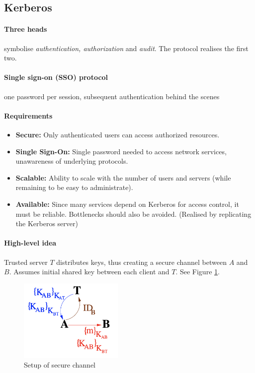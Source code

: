 \subsection{Kerberos}

\paragraph{Three heads} symbolise \emph{authentication, authorization} and \emph{audit}. The protocol realises the first two.

\paragraph{Single sign-on (SSO) protocol} one password per session, subsequent authentication behind the scenes

\paragraph{Requirements}
\begin{itemize}
    \item \textbf{Secure:} Only authenticated users can access authorized resources.
    \item \textbf{Single Sign-On:} Single password needed to access network services, unawareness of underlying protocols.
    \item \textbf{Scalable:} Ability to scale with the number of users and servers (while remaining to be easy to administrate).
    \item \textbf{Available:} Since many services depend on Kerberos for access control, it must be reliable. Bottlenecks should also be avoided. (Realised by replicating the Kerberos server) 
\end{itemize}


\paragraph{High-level idea} Trusted server $T$ distributes keys, thus creating a secure channel between $A$ and $B$. Assumes initial shared key between each client and $T$. See Figure \ref{fig:kerberos-setup}.

\begin{figure}[h]
    \centering
    \includegraphics[width=5cm]{images/ch9-kerberos-setup.png}
    \caption{Setup of secure channel}
    \label{fig:kerberos-setup}
\end{figure}

